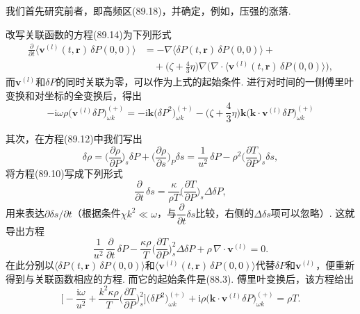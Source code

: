 我们首先研究前者，即高频区(89.18)，并确定，例如，压强的涨落.

改写关联函数的方程(89.14)为下列形式
\begin{equation*}
\begin{aligned}
\frac{\partial}{\partial t}\bigl\langle\bm{v}^{(l)}(t,\bm{r})\,\delta P(0,0)\bigr\rangle&=-\nabla\bigl\langle\delta P(t,\bm{r})\,\delta P(0,0)\bigr\rangle+\\
&\quad+\biggl(\zeta+\frac{4}{3}\eta\biggr)\nabla\bigl(\nabla\cdot\bigl\langle\bm{v}^{(l)}(t,\bm{r})\,\delta P(0,0)\bigr\rangle\bigr),
\end{aligned}
\end{equation*}
而$\bm{v}^{(l)}$和$\delta P$的同时关联为零，可以作为上式的起始条件. 进行对时间的一侧傅里叶变换和对坐标的全变换后，得出
\begin{equation}
-\mathrm{i}\omega\rho\bigl(\bm{v}^{(l)}\delta P\bigr)^{(+)}_{\omega k}=-\mathrm{i}\bm{k}\bigl(\delta P^{2}\bigr)^{(+)}_{\omega k}-\biggl(\zeta+\frac{4}{3}\eta\biggr)\bm{k}\bigl(\bm{k}\cdot\bm{v}^{(l)}\delta P\bigr)^{(+)}_{\omega k}
\end{equation}

其次，在方程(89.12)中我们写出
\begin{equation*}
\delta\rho=\biggl(\frac{\partial\rho}{\partial P}\biggr)_{s}\delta P+\biggl(\frac{\partial\rho}{\partial s}\biggr)_{P}\delta s=\frac{1}{u^{2}}\,\delta P-\rho^{2}\biggl(\frac{\partial T}{\partial P}\biggr)_{s}\delta s,
\end{equation*}
将方程(89.10)写成下列形式
\begin{equation*}
\frac{\partial}{\partial t}\,\delta s=\frac{\kappa}{\rho T}\biggl(\frac{\partial T}{\partial P}\biggr)_{s}\Delta\delta P,
\end{equation*}
用来表达$\partial\delta s/\partial t$（根据条件$\chi k^{2}\ll\omega$，与$\dfrac{\partial}{\partial t}\delta s$比较，右侧的$\Delta\delta s$项可以忽略）. 这就导出方程
\begin{equation*}
\frac{1}{u^{2}}\,\frac{\partial}{\partial t}\,\delta P-\frac{\kappa\rho}{T}\biggl(\frac{\partial T}{\partial P}\biggr)^{2}_{s}\Delta\delta P+\rho\,\nabla\cdot\bm{v}^{(l)}=0.
\end{equation*}
在此分别以$\bigl\langle\delta P(t,\bm{r})\,\delta P(0,0)\bigr\rangle$和$\bigl\langle\bm{v}^{(l)}(t,\bm{r})\,\delta P(0,0)\bigr\rangle$代替$\delta P$和$\bm{v}^{(l)}$，便重新得到与关联函数相应的方程. 而它的起始条件是(88.3). 傅里叶变换后，该方程给出
\begin{equation}
\biggl[-\frac{\mathrm{i}\omega}{u^{2}}+\frac{k^{2}\kappa\rho}{T}\biggl(\frac{\partial T}{\partial P}\biggr)^{2}_{s}\biggr]\bigl(\delta P^{2}\bigr)^{(+)}_{\omega k}+\mathrm{i}\rho\bigl(\bm{k}\cdot\bm{v}^{(l)}\delta P\bigr)^{(+)}_{\omega k}=\rho T.
\end{equation}

